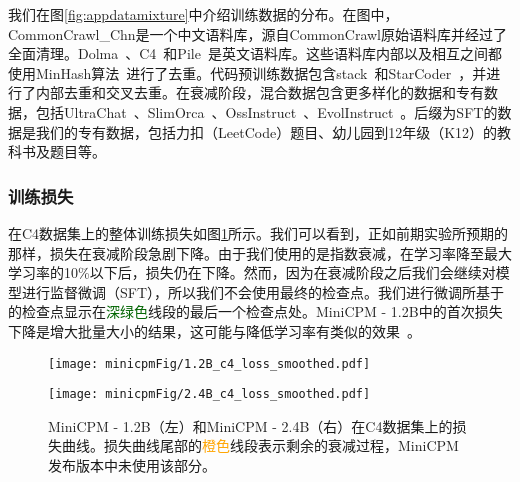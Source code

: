 我们在图\ref{fig:appdatamixture}中介绍训练数据的分布。在图中，CommonCrawl\_Chn是一个中文语料库，源自CommonCrawl原始语料库并经过了全面清理。Dolma~\citep{dolma}、C4~\citep{2019t5}和Pile~\citep{gao2020pile, biderman2022datasheet}是英文语料库。这些语料库内部以及相互之间都使用MinHash算法~\citep{broder1997resemblance}进行了去重。代码预训练数据包含stack~\citep{Kocetkov2022TheStack}和StarCoder~\cite{li2023starcoder}，并进行了内部去重和交叉去重。在衰减阶段，混合数据包含更多样化的数据和专有数据，包括UltraChat~\citep{ding2023enhancing}、SlimOrca~\citep{SlimOrca, SlimOrcaDedup}、OssInstruct~\citep{wei2023magicoder}、EvolInstruct~\citep{xu2023wizardlm}。后缀为SFT的数据是我们的专有数据，包括力扣（LeetCode）题目、幼儿园到12年级（K12）的教科书及题目等。 

\subsubsection{训练损失}


在C4数据集上的整体训练损失如图\ref{fig:loss_c4}所示。我们可以看到，正如前期实验所预期的那样，损失在衰减阶段急剧下降。由于我们使用的是指数衰减，在学习率降至最大学习率的10\%以下后，损失仍在下降。然而，因为在衰减阶段之后我们会继续对模型进行监督微调（SFT），所以我们不会使用最终的检查点。我们进行微调所基于的检查点显示在\textcolor{darkgreen}{深绿色}线段的最后一个检查点处。MiniCPM - 1.2B中的首次损失下降是增大批量大小的结果，这可能与降低学习率有类似的效果~\citep{smith2017don}。


\begin{figure}[htbp]
        \centering
        \texttt{[image: minicpmFig/1.2B\_c4\_loss\_smoothed.pdf]}
\end{figure}

\begin{figure}[htbp]
    \centering
    \texttt{[image: minicpmFig/2.4B\_c4\_loss\_smoothed.pdf]}
    \caption{MiniCPM - 1.2B（左）和MiniCPM - 2.4B（右）在C4数据集上的损失曲线。损失曲线尾部的\textcolor{orange}{橙色}线段表示剩余的衰减过程，MiniCPM发布版本中未使用该部分。}
    \label{fig:loss_c4}
\end{figure}

